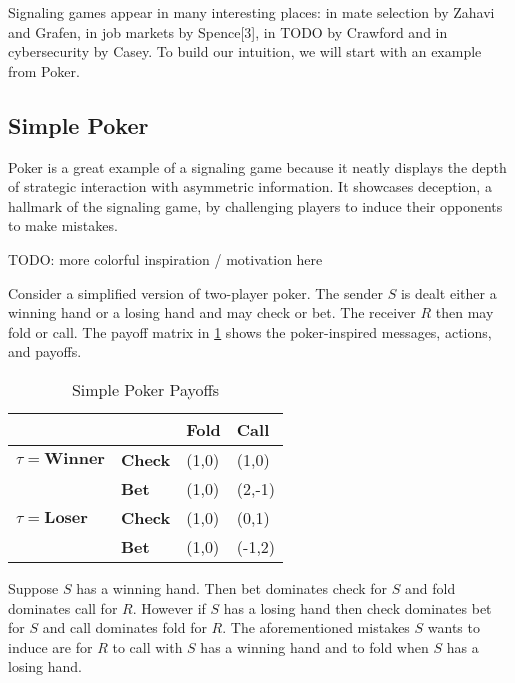 \documentclass{article}
\begin{document}
Signaling games appear in many interesting places: in mate selection by Zahavi\cite{zahavi1} and Grafen\cite{grafen1}, in job markets by Spence[3], in TODO by Crawford\cite{crawford1} and in cybersecurity by Casey\cite{casey1}\cite{casey2}\cite{casey3}. To build our intuition, we will start with an example from Poker.

\subsection{Simple Poker}

Poker is a great example of a signaling game because it neatly displays the depth of strategic interaction with asymmetric information. It showcases deception, a hallmark of the signaling game, by challenging players to induce their opponents to make mistakes.

TODO: more colorful inspiration / motivation here

Consider a simplified version of two-player poker. The sender $S$ is dealt either a winning hand or a losing hand and may check or bet. The receiver $R$ then may fold or call. The payoff matrix in \ref{simplepokerpayoffs} shows the poker-inspired messages, actions, and payoffs.

\begin{table}[H]
	\centering
	\caption{Simple Poker Payoffs}
	\label{simplepokerpayoffs}
	\begin{tabular}{ll|l|l|}
		\cline{3-4}
		&       & \textbf{Fold} & \textbf{Call} \\ \hline
		\multicolumn{1}{|l|}{$\tau=\textbf{Winner}$} & \textbf{Check} & (1,0)  & (1,0)  \\ \cline{2-4}
		\multicolumn{1}{|l|}{}        & \textbf{Bet}   & (1,0)  & (2,-1)  \\ \hline
		\multicolumn{1}{|l|}{$\tau=\textbf{Loser}$}  & \textbf{Check} & (1,0)  & (0,1)  \\ \cline{2-4}
		\multicolumn{1}{|l|}{}        & \textbf{Bet}   & (1,0)  & (-1,2) \\ \hline
	\end{tabular}
\end{table}

Suppose $S$ has a winning hand. Then bet dominates check for $S$ and fold dominates call for $R$. However if $S$ has a losing hand then check dominates bet for $S$ and call dominates fold for $R$. The aforementioned mistakes $S$ wants to induce are for $R$ to call with $S$ has a winning hand and to fold when $S$ has a losing hand.
\end{document}

